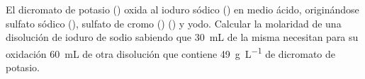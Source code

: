 El dicromato de potasio () oxida al ioduro sódico () en medio ácido, originándose sulfato sódico (), sulfato de cromo () () y yodo. Calcular la molaridad de una disolución de ioduro de sodio sabiendo que \SI{30}{\milli\liter} de la misma necesitan para su oxidación \SI{60}{\milli\liter} de otra disolución que contiene \SI{49}{\gram\per\liter} de dicromato de potasio.
